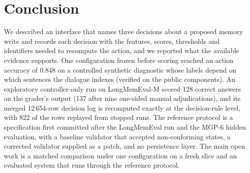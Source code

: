 \section{Conclusion}
\label{sec:conclusion}
We described an interface that names three decisions about a proposed memory write and records each decision with the features, scores, thresholds and identifiers needed to recompute the action, and we reported what the available evidence supports. One configuration frozen before scoring reached an action accuracy of 0.848 on a controlled synthetic diagnostic whose labels depend on which sentences the dialogue indexes (verified on the public components). An exploratory controller-only run on LongMemEval-M scored 128 correct answers on the grader's output (137 after nine one-sided manual adjudications), and its merged 12\,654-row decision log is recomputed exactly at the decision-rule level, with 822 of the rows replayed from stopped runs. The reference protocol is a specification first committed after the LongMemEval run and the MGP-6 hidden evaluation, with a baseline validator that accepted non-conforming states, a corrected validator supplied as a patch, and no persistence layer. The main open work is a matched comparison under one configuration on a fresh slice and an evaluated system that runs through the reference protocol.
